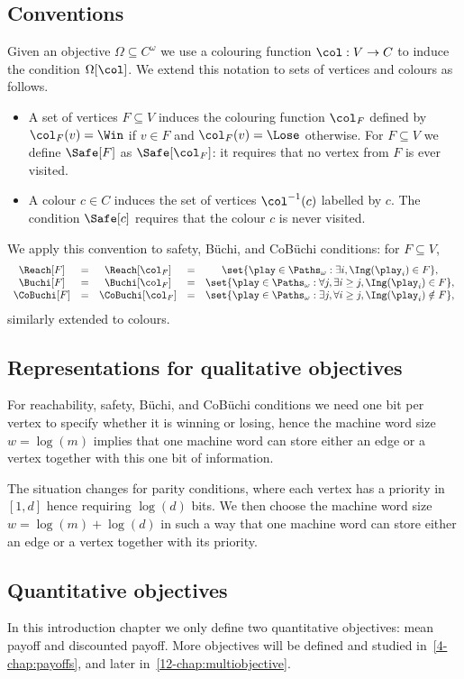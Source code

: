 \subsection*{Conventions}
Given an objective $\Omega \subseteq C^\omega$ we use a colouring function $\col : V \to C$ to induce the condition $\Omega[\col]$.
We extend this notation to sets of vertices and colours as follows.
\begin{itemize}
	\item A set of vertices $F \subseteq V$ induces the colouring function $\col_F$ defined by 
	$\col_F(v) = \Win$ if $v \in F$ and $\col_F(v) = \Lose$ otherwise.
	For $F \subseteq V$ we define $\Safe[F]$ as $\Safe[\col_F]$: it requires that no vertex from $F$ is ever visited.
	\item A colour $c \in C$ induces the set of vertices $\col^{-1}(c)$ labelled by $c$.
	The condition $\Safe[c]$ requires that the colour $c$ is never visited.
\end{itemize}
We apply this convention to safety, B{\"u}chi, and CoB{\"u}chi conditions: for $F \subseteq V$,
\[
\begin{array}{ccccc}
\Reach[F] & = & \Reach[\col_F] & = & \set{\play \in \Paths_\omega : \exists i, \Ing(\play_i) \in F}, \\
\Buchi[F] & = & \Buchi[\col_F] & = & \set{\play \in \Paths_\omega : \forall j, \exists i \ge j, \Ing(\play_i) \in F}, \\
\CoBuchi[F] & = & \CoBuchi[\col_F] & = & \set{\play \in \Paths_\omega : \exists j, \forall i \ge j, \Ing(\play_i) \notin F},
\end{array}
\] 
similarly extended to colours.

\subsection*{Representations for qualitative objectives}
For reachability, safety, B{\"u}chi, and CoB{\"u}chi conditions we need one bit per vertex to specify whether it is winning or losing,
hence the machine word size $w = \log(m)$ implies that one machine word can store either an edge or a vertex together with this one bit of information.

The situation changes for parity conditions, where each vertex has a priority in $[1,d]$ hence requiring $\log(d)$ bits.
We then choose the machine word size $w = \log(m) + \log(d)$ in such a way that one machine word can store
either an edge or a vertex together with its priority.

\subsection*{Quantitative objectives}
In this introduction chapter we only define two quantitative objectives: mean payoff and discounted payoff.
More objectives will be defined and studied in~\cref{4-chap:payoffs}, and later in~\cref{12-chap:multiobjective}.

